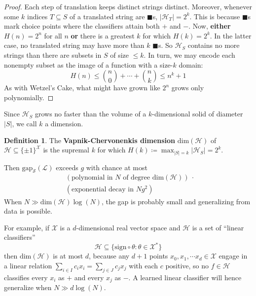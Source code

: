 \documentclass[twocolumn, 11pt]{article}
\newcommand{\Hh}{\mathcal{H}}
\newcommand{\Ll}{\mathcal{L}}
\newcommand{\Ss}{\mathcal{S}}
\newcommand{\Xx}{\mathcal{X}}
\newcommand{\Egap} {\text{gap}_{\Ss}}
\theoremstyle{definition}
\newtheorem*{dfn}{Definition}
\begin{document}
\begin{proof}
            Each step of translation keeps distinct strings distinct.
            Moreover, whenever some $k$ indices $T\subseteq S$ of a translated
            string are $\blacksquare$s, $|\Hh_T| = 2^k$.  This is because
            $\blacksquare$s mark choice points where the classifiers attain
            both $+$ and $-$.
            Now, \textbf{either} $H(n)=2^n$ for all $n$ \textbf{or} there is a
            greatest $k$ for which $H(k) = 2^k$.  In the latter case, no
            translated string may have more than $k$ $\blacksquare$s.  So
            $\Hh_S$ contains no more strings than there are subsets in $S$ of
            size $\leq k$.  In turn, we may encode each nonempty subset as the
            image of a function with a size-$k$ domain:
            $$
                H(n)
                \leq 
                {n\choose 0} + \cdots + {n\choose k}
                \leq 
                n^k + 1
            $$
            As with Wetzel's Cake, what might have grown like $2^n$ grows only
            polynomially.
        \end{proof}
    
        Since $\Hh_S$ grows no faster than the volume of a
        $k$-dimensional solid of diameter $|S|$, we call $k$ a dimension.
        \begin{dfn}
            The \textbf{Vapnik-Chervonenkis dimension} $\text{dim}(\Hh)$
            of $\Hh \subseteq \{\pm 1\}^\Xx$
            is the supremal $k$ for which $H(k) \coloneqq
            \max_{|S|=k} |\Hh_S| = 2^k$.  
        \end{dfn}

        Then $\Egap(\Ll)$ exceeds $g$ with chance at most
        \begin{align*}
            &(\text{polynomial in $N$ of degree $\text{dim}(\Hh)$}) ~\cdot~ \\
            &(\text{exponential decay in $Ng^2$})
        \end{align*}
        When $N\gg \text{dim}(\Hh) \log(N)$, the gap is probably small and
        generalizing from data is possible.

        For example, if $\Xx$ is a $d$-dimensional real vector space
        and $\Hh$ is a set of ``linear classifiers''
        $$
            \Hh \subseteq \{
                \text{sign} \circ \theta
                :
                \theta \in \Xx^*
            \}
        $$
        then $\text{dim}(\Hh)$ is at most $d$,
        because any $d+1$ points $x_0, x_1,\cdots x_d \in \Xx$ engage in
        a linear relation
        $
            \sum_{i\in I} c_i x_i
            =
            \sum_{j\in J} c_j x_j
        $
        with each $c$ positive, so no $f\in \Hh$ classifies every $x_i$ as $+$
        and every $x_j$ as $-$.  A learned linear classifier will hence
        generalize when $N \gg d \log(N)$.
\end{document}
